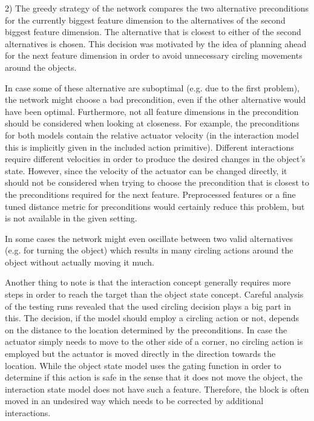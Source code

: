 2) The greedy strategy of the network compares the two alternative preconditions for the currently biggest feature dimension to the alternatives of the second biggest feature dimension. The alternative that is closest to either of the second alternatives is chosen. This decision was motivated by the idea of planning ahead for the next feature dimension in order to avoid unnecessary circling movements around the objects.

In case some of these alternative are suboptimal (e.g. due to the first problem), the network might choose a bad precondition, even if the other alternative would have been optimal. 
Furthermore, not all feature dimensions in the precondition should be considered when looking at closeness. For example, the preconditions for both models contain the relative actuator velocity (in the interaction model this is implicitly given in the included action primitive). 
Different interactions require different velocities in order to produce the desired changes in the object's state. 
However, since the velocity of the actuator can be changed directly, it should not be considered when trying to choose the precondition that is closest to the preconditions required for the next feature. Preprocessed features or a fine tuned distance metric for preconditions would certainly reduce this problem, but is not available in the given setting.

In some cases the network might even oscillate between two valid alternatives (e.g. for turning the object) which results in many circling actions around the object without actually moving it much.

Another thing to note is that the interaction concept generally requires more steps in order to reach the target than the object state concept. Careful analysis of the testing runs revealed that the used circling decision plays a big part in this. The decision, if the model should employ a circling action or not, depends on the distance to the location determined by the preconditions. In case the actuator simply needs to move to the other side of a corner, no circling action is employed but the actuator is moved directly in the direction towards the location. While the object state model uses the gating function in order to determine if this action is safe in the sense that it does not move the object, the interaction state model does not have such a feature. Therefore, the block is often moved in an undesired way which needs to be corrected by additional interactions.

